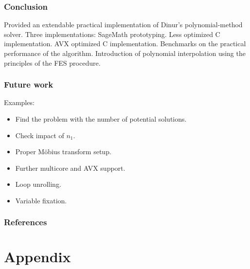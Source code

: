 \documentclass{beamer}
\begin{document}
\begin{frame}
    \frametitle{Conclusion}
    \begin{outline}
        \1 Provided an extendable practical implementation of Dinur's polynomial-method solver.
            \2 Three implementations:
                \3 SageMath prototyping.
                \3 Less optimized C implementation.
                \3 AVX optimized C implementation.
        \1 Benchmarks on the practical performance of the algorithm.
        \1 Introduction of polynomial interpolation using the principles of the FES procedure.
    \end{outline}
\end{frame}

\begin{frame}
    \frametitle{Future work}
    Examples:
    \begin{itemize}
        \item Find the problem with the number of potential solutions.
        \item Check impact of $n_1$.
        \item Proper Möbius transform setup.
        \item Further multicore and AVX support.
        \item Loop unrolling.
        \item Variable fixation.
    \end{itemize}
\end{frame}

\begin{frame}
    \frametitle{References}
    \printbibliography
\end{frame}

\section{Appendix}
\end{document}
